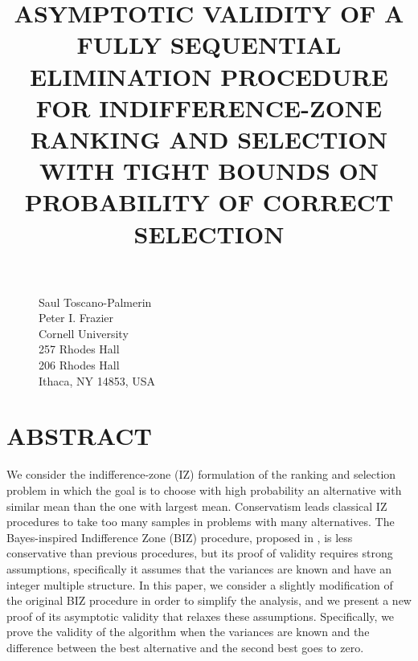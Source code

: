 \documentclass{wscpaperproc}
\theoremstyle{wsc}
\begin{document}
%
%

\title{ASYMPTOTIC VALIDITY OF A FULLY SEQUENTIAL ELIMINATION PROCEDURE FOR INDIFFERENCE-ZONE RANKING AND SELECTION WITH TIGHT BOUNDS ON PROBABILITY OF CORRECT SELECTION}


\maketitle

\begin{figure}[htb]
{
\centering
Saul Toscano-Palmerin \\
Peter I. Frazier \\
\vspace{12pt}
Cornell University \\
257 Rhodes Hall \\
206 Rhodes Hall \\
Ithaca, NY 14853, USA\\
}
\end{figure}


\section*{ABSTRACT}
We consider the indifference-zone (IZ) formulation of the ranking
and selection problem in which the goal is to choose with high probability 
an alternative with similar mean than the one with largest mean. 
Conservatism leads classical IZ procedures
to take too many samples in problems with many alternatives. The Bayes-inspired
Indifference Zone (BIZ) procedure, proposed in , is
less conservative than previous procedures, but its proof of validity
requires strong assumptions, specifically it assumes that the variances are known 
and have an integer multiple structure. In this paper, we consider a slightly
modification of the original BIZ procedure in order to simplify the analysis, and we
present a new proof of its asymptotic validity that relaxes these assumptions.
Specifically, we prove the validity of the algorithm when the variances are known
and the difference between the best alternative and the second best goes to zero. 
\end{document}
